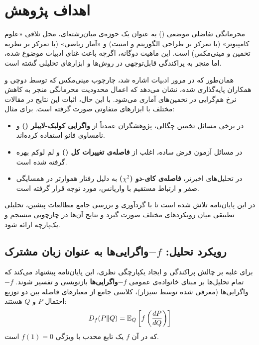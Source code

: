 \section{اهداف پژوهش}
\label{sec:intro:problem-statement}

محرمانگی تفاضلی موضعی () به عنوان یک حوزه‌ی میان‌رشته‌ای، محل تلاقی «علوم کامپیوتر» (با تمرکز بر طراحی الگوریتم و امنیت) و «آمار ریاضی» (با تمرکز بر نظریه تخمین و مینی‌مکس) است. این ماهیت دوگانه، اگرچه باعث غنای ادبیات موضوع شده، اما منجر به پراکندگی قابل‌توجهی در روش‌ها و ابزارهای تحلیلی گشته است.

همان‌طور که در مرور ادبیات اشاره شد، چارچوب مینی‌مکس که توسط دوچی و همکاران \cite{Duchi2013} پایه‌گذاری شده، نشان می‌دهد که اعمال محدودیت محرمانگی منجر به کاهش نرخ هم‌گرایی در تخمین‌های آماری می‌شود. با این حال، اثبات این نتایج در مقالات مختلف با ابزارهای متفاوتی صورت گرفته است. برای مثال:
\begin{itemize}
    \item در برخی مسائل تخمین چگالی، پژوهشگران عمدتاً از \textbf{واگرایی کولبک-لایبلر ()} و نامساوی فانو استفاده کرده‌اند.
    \item در مسائل آزمون فرض ساده، اغلب از \textbf{فاصله‌ی تغییرات کل ()} و لم لوکم بهره گرفته شده است.
    \item در تحلیل‌های اخیرتر، \textbf{فاصله‌ی کای-دو ($\chi^2$)} به دلیل رفتار هموارتر در همسایگی صفر و ارتباط مستقیم با واریانس، مورد توجه قرار گرفته است.
\end{itemize}

در این پایان‌نامه تلاش شده است تا با گردآوری و بررسی جامع مطالعات پیشین، تحلیلی تطبیقی میان رویکردهای مختلف صورت گیرد و نتایج آن‌ها در چارچوبی منسجم و یک‌پارچه ارائه شود.

\subsection{رویکرد تحلیل: $-f$واگرایی‌ها به عنوان زبان مشترک}
\label{sec:intro:f-div-approach}

برای غلبه بر چالش پراکندگی و ایجاد یکپارچگی نظری، این پایان‌نامه پیشنهاد می‌کند که تمام تحلیل‌ها بر مبنای خانواده‌ی عمومی \textbf{$-f$واگرایی‌ها} بازنویسی و تفسیر شوند.
$-f$واگرایی‌ها (معرفی شده توسط سیزار)، کلاسی جامع از معیارهای فاصله بین دو توزیع احتمال $P$ و $Q$ هستند:
\begin{equation}
D_f(P \| Q) = \Eset_Q \left[ f\left( \frac{dP}{dQ} \right) \right]
\end{equation}
که در آن $f$ یک تابع محدب با ویژگی $f(1)=0$ است.

